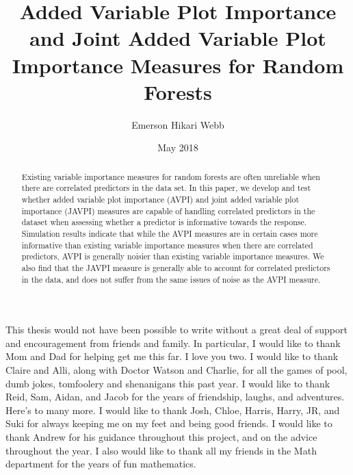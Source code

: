\documentclass[12pt,twoside]{reedthesis}
\title{Added Variable Plot Importance and Joint Added Variable Plot Importance
Measures for Random Forests}
\author{Emerson Hikari Webb}
\date{May 2018}
\theoremstyle{definition}
\theoremstyle{definition}
\theoremstyle{definition}
\theoremstyle{remark}
\begin{document}
  \maketitle

\frontmatter %
\pagestyle{empty} %
  \begin{acknowledgements}
    This thesis would not have been possible to write without a great deal
    of support and encouragement from friends and family. In particular, I
    would like to thank Mom and Dad for helping get me this far. I love you
    two. I would like to thank Claire and Alli, along with Doctor Watson and
    Charlie, for all the games of pool, dumb jokes, tomfoolery and
    shenanigans this past year. I would like to thank Reid, Sam, Aidan, and
    Jacob for the years of friendship, laughs, and adventures. Here's to
    many more. I would like to thank Josh, Chloe, Harris, Harry, JR, and
    Suki for always keeping me on my feet and being good friends. I would
    like to thank Andrew for his guidance throughout this project, and on
    the advice throughout the year. I also would like to thank all my
    friends in the Math department for the years of fun mathematics.
  \end{acknowledgements}

  \hypersetup{linkcolor=black}
  \setcounter{tocdepth}{2}
  \tableofcontents

  \listoftables

  \listoffigures
  \begin{abstract}
    Existing variable importance measures for random forests are often
    unreliable when there are correlated predictors in the data set. In this
    paper, we develop and test whether added variable plot importance (AVPI)
    and joint added variable plot importance (JAVPI) measures are capable of
    handling correlated predictors in the dataset when assessing whether a
    predictor is informative towards the response. Simulation results
    indicate that while the AVPI measures are in certain cases more
    informative than existing variable importance measures when there are
    correlated predictors, AVPI is generally noisier than existing variable
    importance measures. We also find that the JAVPI measure is generally
    able to account for correlated predictors in the data, and does not
    suffer from the same issues of noise as the AVPI measure. \par
  \end{abstract}
\end{document}
